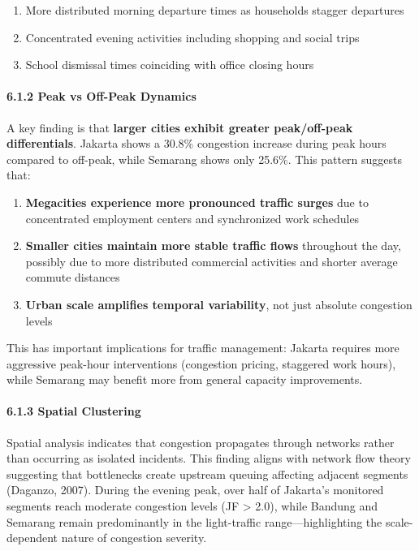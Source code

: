 \documentclass[
  12pt,
]{article}
\providecommand{\tightlist}{%
  \setlength{\itemsep}{0pt}\setlength{\parskip}{0pt}}
\begin{document}
\begin{enumerate}
\def\labelenumi{\arabic{enumi}.}
\tightlist
\item
  More distributed morning departure times as households stagger departures
\item
  Concentrated evening activities including shopping and social trips
\item
  School dismissal times coinciding with office closing hours
\end{enumerate}

\paragraph{6.1.2 Peak vs Off-Peak Dynamics}\label{peak-vs-off-peak-dynamics}

A key finding is that \textbf{larger cities exhibit greater peak/off-peak differentials}. Jakarta shows a 30.8\% congestion increase during peak hours compared to off-peak, while Semarang shows only 25.6\%. This pattern suggests that:

\begin{enumerate}
\def\labelenumi{\arabic{enumi}.}
\tightlist
\item
  \textbf{Megacities experience more pronounced traffic surges} due to concentrated employment centers and synchronized work schedules
\item
  \textbf{Smaller cities maintain more stable traffic flows} throughout the day, possibly due to more distributed commercial activities and shorter average commute distances
\item
  \textbf{Urban scale amplifies temporal variability}, not just absolute congestion levels
\end{enumerate}

This has important implications for traffic management: Jakarta requires more aggressive peak-hour interventions (congestion pricing, staggered work hours), while Semarang may benefit more from general capacity improvements.

\paragraph{6.1.3 Spatial Clustering}\label{spatial-clustering}

Spatial analysis indicates that congestion propagates through networks rather than occurring as isolated incidents. This finding aligns with network flow theory suggesting that bottlenecks create upstream queuing affecting adjacent segments (Daganzo, 2007). During the evening peak, over half of Jakarta's monitored segments reach moderate congestion levels (JF \textgreater{} 2.0), while Bandung and Semarang remain predominantly in the light-traffic range---highlighting the scale-dependent nature of congestion severity.
\end{document}
